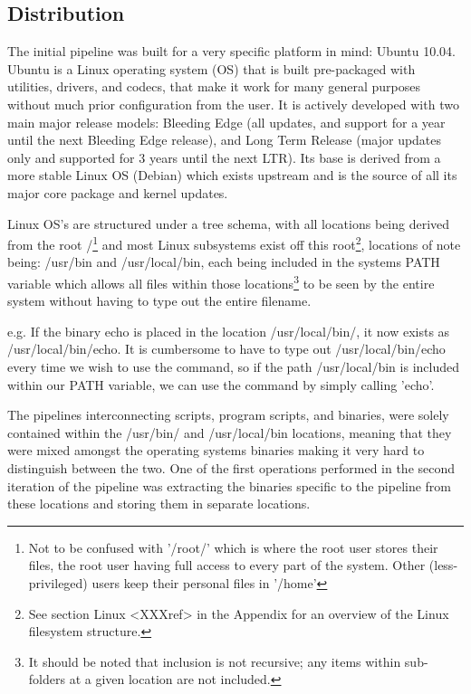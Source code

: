 \subsection{Distribution}

The initial pipeline was built for a very specific platform in mind: Ubuntu 10.04. Ubuntu is a Linux operating system (OS) that is built pre-packaged with utilities, drivers, and codecs, that make it work for many general purposes without much prior configuration from the user. It is actively developed with two main major release models: Bleeding Edge (all updates, and support for a year until the next Bleeding Edge release), and Long Term Release (major updates only and supported for 3 years until the next LTR).  Its base is derived from a more stable Linux OS (Debian) which exists upstream and is the source of all its major core package and kernel updates.

Linux OS's are structured under a tree schema, with all locations being derived from the root /\footnote{Not to be confused with '/root/' which is where the root user stores their files, the root user having full access to every part of the system. Other (less-privileged) users keep their personal files in '/home'} and most Linux subsystems exist off this root\footnote{See section Linux <XXXref> in the Appendix for an overview of the Linux filesystem structure.}, locations of note being: /usr/bin and /usr/local/bin, each being included in the systems PATH variable which allows all files within those locations\footnote{It should be noted that inclusion is not recursive; any items within sub-folders at a given location are not included.} to be seen by the entire system without having to type out the entire filename.

e.g. If the binary \gls{echo} is placed in the location /usr/local/bin/, it now exists as /usr/local/bin/echo. It is cumbersome to have to type out /usr/local/bin/echo every time we wish to use the command, so if the path /usr/local/bin is included within our \gls{PATH} variable, we can use the command by simply calling 'echo'.

The pipelines interconnecting scripts, program scripts, and binaries, were solely contained within the /usr/bin/ and /usr/local/bin locations, meaning that they were mixed amongst the operating systems binaries making it very hard to distinguish between the two. One of the first operations performed in the second iteration of the pipeline was extracting the binaries specific to the pipeline from these locations and storing them in separate locations. 

